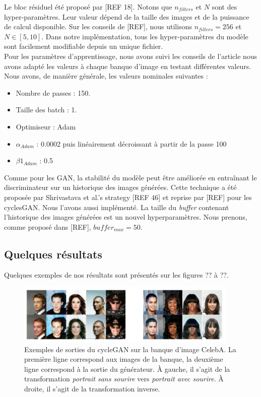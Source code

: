 Le bloc résiduel été proposé par [REF 18]. Notons que $n_{filters}$ et $N$ sont des hyper-paramètres. Leur valeur dépend de la taille des images et de la puissance de calcul disponible. Sur les conseils de [REF], nous utilisons $n_{filters} = 256$ et $N \in [5, 10]$. Dans notre implémentation, tous les hyper-paramètres du modèle sont facilement modifiable depuis un unique fichier. \\


Pour les paramètres d'apprentissage, nous avons suivi les conseils de l'article nous avons adapté les valeurs à chaque banque d'image en testant différentes valeurs. Nous avons, de manière générale, les valeurs nominales suivantes : \\

\begin{itemize}
  \item Nombre de passes : 150.
  \item Taille des batch : 1.
  \item Optimiseur : Adam
  \item $\alpha_{Adam}$ : 0.0002 puis linéairement décroissant à partir de la passe 100
  \item $\beta1_{Adam}$ : 0.5\\
\end{itemize}

Comme pour les GAN, la stabilité du modèle peut être améliorée en entraînant le discriminateur sur un historique des images générées. Cette technique a été proposée par Shrivastava  et  al.’s  strategy  [REF 46] et reprise par [REF] pour les cyclesGAN. Nous l'avons aussi implémenté. La taille du \textit{buffer} contenant l'historique des images générées est un nouvel hyperparamètres. Nous prenons, comme proposé dans [REF], $buffer_{max} = 50$.

\subsection{Quelques résultats}

Quelques exemples de nos résultats sont présentés sur les figures ?? à ??.

\begin{figure}[!h]
\centering
\includegraphics[width=300pt]{"images/cycle"}
\caption{Exemples de sorties du cycleGAN sur la banque d'image CelebA. La première ligne correspond aux images de la banque, la deuxième ligne correspond à la sortie du générateur. À gauche, il s'agit de la transformation \textit{portrait sans sourire} vers \textit{portrait avec sourire}. À droite, il s'agit de la transformation inverse.}
\end{figure}

